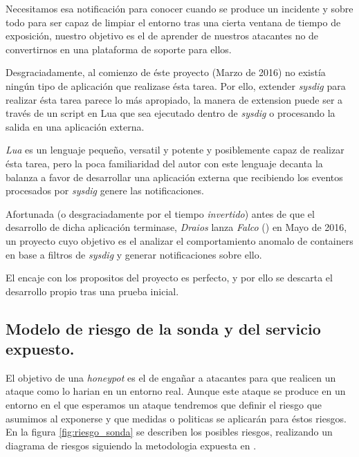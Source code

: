 Necesitamos esa notificación para conocer cuando se produce un incidente y sobre todo para ser capaz de limpiar el entorno tras una
cierta ventana de tiempo de exposición, nuestro objetivo es el de aprender de nuestros atacantes no de convertirnos en una plataforma de soporte
para ellos.

Desgraciadamente, al comienzo de éste proyecto (Marzo de 2016) no existía ningún tipo de aplicación que realizase ésta tarea.
Por ello, extender \emph{sysdig} para realizar ésta tarea parece lo más apropiado, la manera de extension puede ser a través de un
script en Lua que sea ejecutado dentro de \emph{sysdig} o procesando la salida en una aplicación externa.

\emph{Lua} es un lenguaje pequeño, versatil y potente y posiblemente capaz de realizar ésta tarea, pero la poca familiaridad del autor con este lenguaje decanta
la balanza a favor de desarrollar una aplicación externa que recibiendo los eventos procesados por \emph{sysdig} genere las notificaciones.

Afortunada (o desgraciadamente por el tiempo \emph{invertido}) antes de que el desarrollo de dicha aplicación terminase, \emph{Draios} lanza \emph{Falco} (\cite{falco-project}) en Mayo de 2016, un proyecto cuyo objetivo
es el analizar el comportamiento anomalo de containers en base a filtros de \emph{sysdig} y generar notificaciones sobre ello.

El encaje con los propositos del proyecto es perfecto, y por ello se descarta el desarrollo propio tras una prueba inicial.

\subsection{Modelo de riesgo de la sonda y del servicio expuesto.}

El objetivo de una  \emph{honeypot} es el de engañar a atacantes para que realicen un ataque como lo harian en un entorno real. Aunque este ataque se produce en un entorno en el que esperamos un ataque
tendremos que definir el riesgo que asumimos al exponerse y que medidas o politicas se aplicarán para éstos riesgos. En la figura \ref{fig:riesgo_sonda} se describen los posibles riesgos, realizando un diagrama de riesgos siguiendo la metodologia expuesta en \cite{Shostack:2014:TMD:2829295}.

